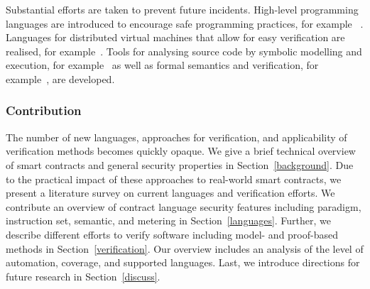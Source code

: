 Substantial efforts are taken to prevent future incidents. 
High-level programming languages are introduced to encourage safe programming practices, for example ~\cite{Hirai2018Bamboo,Ethereum2018Vyper,Schrans2018}.
Languages for distributed virtual machines that allow for easy verification are realised, for example~\cite{Sergey2018,DynamicLedgerSolutions2017,Popejoy2017,Kasampalis2018}.
Tools for analysing source code by symbolic modelling and execution, for example~\cite{Luu2016,Tsankov2017,Kalra2018,Albert2018} as well as formal semantics and verification, for example~\cite{Bhargavan2016,Hildenbrandt2017,Hirai2017}, are developed.

\subsubsection{Contribution} The number of new languages, approaches for verification, and applicability of verification methods becomes quickly opaque. 
We give a brief technical overview of smart contracts and general security properties in Section~\ref{background}. Due to the practical impact of these approaches to real-world smart contracts, we present a literature survey on current languages and verification efforts.
We contribute an overview of contract language security features including paradigm, instruction set, semantic, and metering in Section~\ref{languages}.
Further, we describe different efforts to verify software including model- and proof-based methods in Section~\ref{verification}. Our overview includes an analysis of the level of automation, coverage, and supported languages.
Last, we introduce directions for future research in Section~\ref{discuss}.

